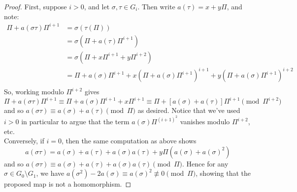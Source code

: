 \begin{proof}
	First, suppose $i > 0$, and let $\sigma,\tau \in G_i$. Then write $a(\tau) = x + y\Pi$, and note:
	\begin{align*}
	\Pi + a(\sigma\tau)\Pi^{i+1}
		&= \sigma(\tau(\Pi)) \\
		&= \sigma(\Pi+a(\tau)\Pi^{i+1}) \\
		&= \sigma(\Pi+x\Pi^{i+1}+y\Pi^{i+2}) \\
		&= \Pi + a(\sigma)\Pi^{i+1} + x(\Pi+a(\sigma)\Pi^{i+1})^{i+1} + y(\Pi+a(\sigma)\Pi^{i+1})^{i+2} \\
	\end{align*}
	So, working modulo $\Pi^{i+2}$ gives
	\[ \Pi + a(\sigma\tau)\Pi^{i+1} \equiv \Pi + a(\sigma)\Pi^{i+1} + x\Pi^{i+1} \equiv \Pi + [a(\sigma)+a(\tau)]\Pi^{i+1} \pmod{\Pi^{i+2}} \]
	and so $a(\sigma\tau) \equiv a(\sigma)+a(\tau) \pmod{\Pi}$ as desired. Notice that we've used $i > 0$ in particular to argue that the term $a(\sigma)\Pi^{(i+1)^2}$ vanishes modulo $\Pi^{i+2}$, etc. \\
	
	Conversely, if $i = 0$, then the same computation as above shows
	\[ a(\sigma\tau) = a(\sigma) + a(\tau) + a(\sigma)a(\tau) + y\Pi(a(\sigma)+a(\sigma)^2) \]
	and so $a(\sigma\tau) \equiv a(\sigma) + a(\tau) + a(\sigma)a(\tau) \pmod{\Pi}$. Hence for any $\sigma \in G_0 \setminus G_1$, we have $a(\sigma^2) - 2a(\sigma) \equiv a(\sigma)^2 \not\equiv 0 \pmod{\Pi}$, showing that the proposed map is not a homomorphism.
\end{proof}
